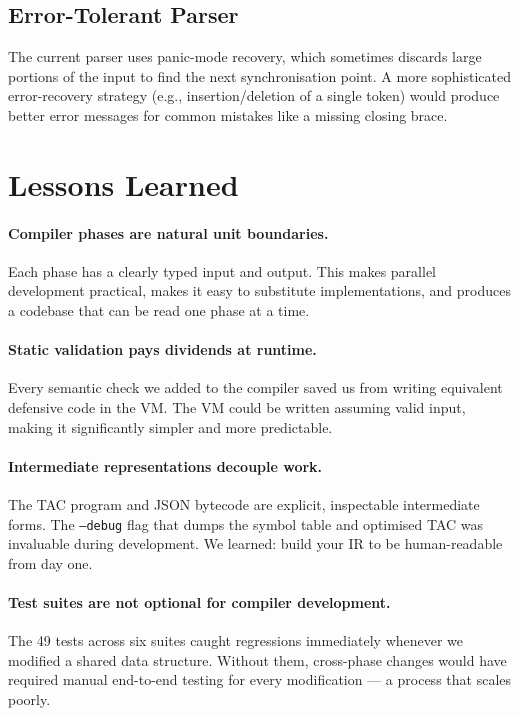 \documentclass[12pt, a4paper]{article}
\begin{document}
\subsection{Error-Tolerant Parser}
The current parser uses panic-mode recovery, which sometimes discards large portions
of the input to find the next synchronisation point.
A more sophisticated error-recovery strategy (e.g., insertion/deletion of a single
token) would produce better error messages for common mistakes like a missing
closing brace.

\section{Lessons Learned}

\paragraph{Compiler phases are natural unit boundaries.}
Each phase has a clearly typed input and output.
This makes parallel development practical, makes it easy to substitute
implementations, and produces a codebase that can be read one phase at a time.

\paragraph{Static validation pays dividends at runtime.}
Every semantic check we added to the compiler saved us from writing equivalent
defensive code in the VM.
The VM could be written assuming valid input, making it significantly simpler
and more predictable.

\paragraph{Intermediate representations decouple work.}
The TAC program and JSON bytecode are explicit, inspectable intermediate forms.
The \texttt{--debug} flag that dumps the symbol table and optimised TAC was
invaluable during development.
We learned: build your IR to be human-readable from day one.

\paragraph{Test suites are not optional for compiler development.}
The 49 tests across six suites caught regressions immediately whenever we
modified a shared data structure.
Without them, cross-phase changes would have required manual end-to-end
testing for every modification --- a process that scales poorly.
\end{document}
